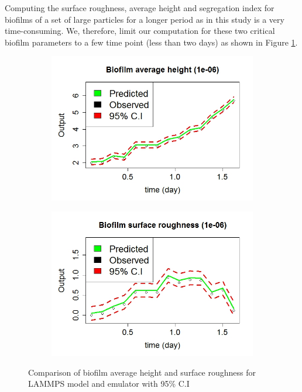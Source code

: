 Computing the surface roughness, average height and segregation index for biofilms of a set of large particles for a longer period as in this study is a very time-consuming. We, therefore, limit our computation for these two critical biofilm parameters to a few time point (less than two days) as shown in Figure \ref{ress3}.
\begin{figure}[!ht]
\begin{subfigure}[b]{.6\textwidth}
\includegraphics[width=1\textwidth]{result2/height}
\end{subfigure}\hspace*{-.5em}
\centering
\begin{subfigure}[b]{.60\textwidth}
\includegraphics[width=1\textwidth]{result2/roughness}
\end{subfigure}\vspace*{-.5em}
\caption[]{Comparison of biofilm average height and surface roughness for LAMMPS model and emulator with 95\% C.I}\label{ress3}
\end{figure}

